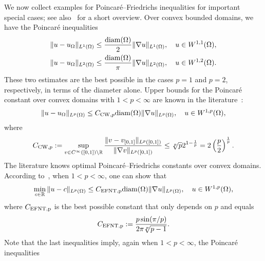 \documentclass[a4paper]{article}
\begin{document}
We now collect examples for Poincar\'e--Friedrichs inequalities for important special cases; see also~\cite[Lemma~3.24]{ern2021finite} for a short overview. 
Over convex bounded domains, we have the Poincar\'e inequalities~\cite{bebendorf2003note,acosta2004optimal} 
\begin{align}\label{math:acostaduran}
    \| u - u_{\Omega} \|_{L^{1}(\Omega)}
    \leq 
    \frac{{\operatorname{diam}}(\Omega)}{2}
    \| \nabla u \|_{L^{1}(\Omega)}
    ,
    \quad 
    u \in W^{1,1}(\Omega)
    ,
    \\
    \| u - u_{\Omega} \|_{L^{2}(\Omega)} \label{math:bebendorf}
    \leq 
    \frac{{\operatorname{diam}}(\Omega)}{\pi}
    \| \nabla u \|_{L^{2}(\Omega)}
    ,
    \quad 
    u \in W^{1,2}(\Omega)
    .
\end{align}
These two estimates are the best possible in the cases $p=1$ and $p=2$, respectively, in terms of the diameter alone. 
Upper bounds for the Poincar\'e constant over convex domains with $1 < p < \infty$ are known in the literature~\cite{chua2006estimates}:
\begin{align}\label{math:chuawheeden}
    \| u - u_{\Omega} \|_{L^{p}(\Omega)}
    \leq 
    C_{{\rm CW},p}
    {\operatorname{diam}}(\Omega)
    \| \nabla u \|_{L^{p}(\Omega)}
    ,
    \quad 
    u \in W^{1,p}(\Omega)
    ,
\end{align}
where 
\begin{align}
    C_{{\rm CW},p} 
    := 
    \sup\limits_{ v \in C^\infty([0,1]) \setminus {\mathbb R} } 
    \frac{ 
        \| v - v_{[0,1]} \|_{L^{p}([0,1])} 
    }{ 
        \| \nabla v \|_{L^{p}([0,1])} 
    }
    \leq 
    \sqrt[p]{p} 2^{1-\frac 1 p}
    =
    2
    \left( \frac p 2 \right)^{\frac 1 p}
    .
\end{align}
The literature knows optimal Poincar\'e--Friedrichs constants over convex domains. 
According to~\cite{ferone2012remark,esposito2013poincare}, when $1 < p < \infty$, one can show that 
\begin{align}\label{math:esposito:pf}
    \min\limits_{ c \in {\mathbb R} }
    \| u - c \|_{L^{p}(\Omega)}
    \leq 
    C_{\rm{EFNT},p}
    {\operatorname{diam}}(\Omega)
    \| \nabla u \|_{L^{p}(\Omega)}
    ,
    \quad 
    u \in W^{1,p}(\Omega)
    ,
\end{align}
where $C_{\rm{EFNT},p}$ is the best possible constant that only depends on $p$ and equals 
\begin{align}
    C_{\rm{EFNT},p}
    :=
    \frac{ p \sin(\pi/p) }{ 2\pi \sqrt[p]{p-1} }
    .
\end{align}
Note that the last inequalities imply, again when $1 < p < \infty$, the Poincar\'e inequalities
\end{document}
